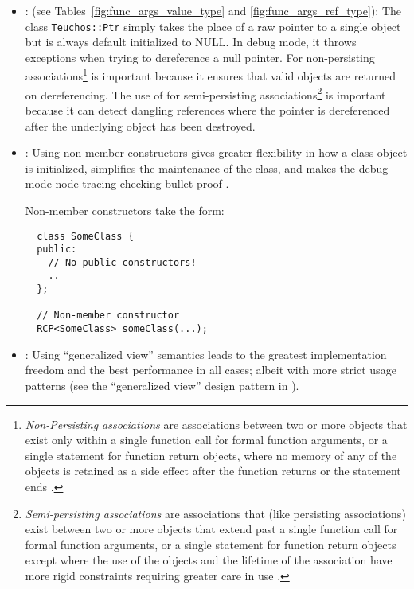 \begin{itemize}
{}\item\GCGTeuchosPtr: (see Tables~\ref{fig:func_args_value_type} and
{}\ref{fig:func_args_ref_type}): The class {}\texttt{Teuchos\-::Ptr}
simply takes the place of a raw pointer to a single object but is
always default initialized to NULL.  In debug mode, it throws
exceptions when trying to dereference a null pointer.  For
non-persisting associations\footnote{\textit{Non-Persisting
associations} are associations between two or more objects that exist
only within a single function call for formal function arguments, or a
single statement for function return objects, where no memory of any
of the objects is retained as a side effect after the function returns
or the statement ends {}\cite{RefCountPtrBeginnersGuide,
TeuchosMemoryManagementGuide}.} {} is important
because it ensures that valid objects are returned on dereferencing.
The use of {} for semi-persisting
associations\footnote{\textit{Semi-persisting associations} are
associations that (like persisting associations) exist between two or
more objects that extend past a single function call for formal
function arguments, or a single statement for function return objects
except where the use of the objects and the lifetime of the
association have more rigid constraints requiring greater care in use
{}\cite{RefCountPtrBeginnersGuide, TeuchosMemoryManagementGuide}.} is
important because it can detect dangling references where the pointer
is dereferenced after the underlying object has been destroyed.


{}\item\GCGNonmemberConstructors: Using non-member constructors gives
greater flexibility in how a class object is initialized, simplifies
the maintenance of the class, and makes the debug-mode node tracing
checking bullet-proof {}\cite{TeuchosMemoryManagementGuide}.

Non-member constructors take the form:

{\small\begin{verbatim}
  class SomeClass {
  public:
    // No public constructors!
    ..
  };

  // Non-member constructor
  RCP<SomeClass> someClass(...);
\end{verbatim}}


{}\item\GCGGeneralizedViews: Using ``generalized view'' semantics
leads to the greatest implementation freedom and the best performance
in all cases; albeit with more strict usage patterns (see the
``generalized view'' design pattern in
{}\cite{TeuchosMemoryManagementGuide}).


\end{itemize}
